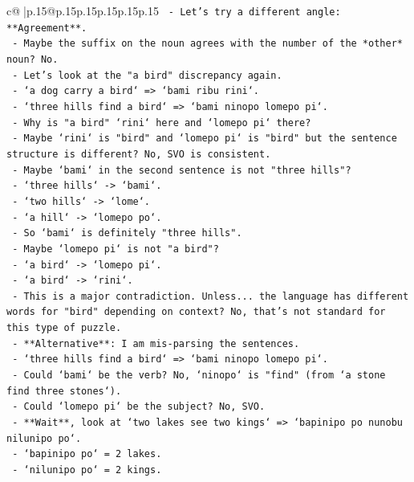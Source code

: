 \documentclass{article}
\begin{document}
{\begin{supertabular}{c@{$\;$}|p{.15\linewidth}@{}p{.15\linewidth}p{.15\linewidth}p{.15\linewidth}p{.15\linewidth}p{.15\linewidth}}
{{{\texttt{   {-} Let's try a different angle: **Agreement**.} \\
\texttt{     {-} Maybe the suffix on the noun agrees with the number of the *other* noun? No.} \\
\texttt{   {-} Let's look at the "a bird" discrepancy again.} \\
\texttt{     {-} `a dog carry a bird` => `bami ribu rini`.} \\
\texttt{     {-} `three hills find a bird` => `bami ninopo lomepo pi`.} \\
\texttt{     {-} Why is "a bird" `rini` here and `lomepo pi` there?} \\
\texttt{     {-} Maybe `rini` is "bird" and `lomepo pi` is "bird" but the sentence structure is different? No, SVO is consistent.} \\
\texttt{     {-} Maybe `bami` in the second sentence is not "three hills"?} \\
\texttt{       {-} `three hills` {-}> `bami`.} \\
\texttt{       {-} `two hills` {-}> `lome`.} \\
\texttt{       {-} `a hill` {-}> `lomepo po`.} \\
\texttt{       {-} So `bami` is definitely "three hills".} \\
\texttt{     {-} Maybe `lomepo pi` is not "a bird"?} \\
\texttt{       {-} `a bird` {-}> `lomepo pi`.} \\
\texttt{       {-} `a bird` {-}> `rini`.} \\
\texttt{     {-} This is a major contradiction. Unless... the language has different words for "bird" depending on context? No, that's not standard for this type of puzzle.} \\
\texttt{     {-} **Alternative**: I am mis{-}parsing the sentences.} \\
\texttt{       {-} `three hills find a bird` => `bami ninopo lomepo pi`.} \\
\texttt{       {-} Could `bami` be the verb? No, `ninopo` is "find" (from `a stone find three stones`).} \\
\texttt{       {-} Could `lomepo pi` be the subject? No, SVO.} \\
\texttt{     {-} **Wait**, look at `two lakes see two kings` => `bapinipo po nunobu nilunipo po`.} \\
\texttt{       {-} `bapinipo po` = 2 lakes.} \\
\texttt{       {-} `nilunipo po` = 2 kings.} \\
}}}
\end{supertabular}}
\end{document}
